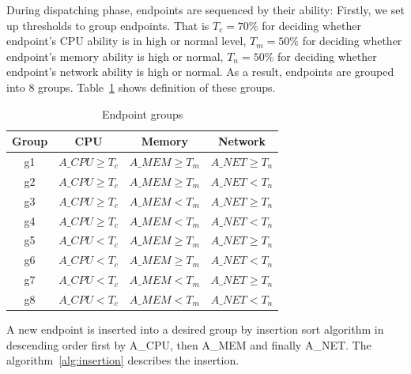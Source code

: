 During dispatching phase, endpoints are sequenced by their ability: Firstly, we set up thresholds to group endpoints. That is $T_{c} = 70\%$ for deciding whether endpoint's CPU ability is in high or normal level, $T_{m} = 50\%$ for deciding whether endpoint's memory ability is high or normal, $T_{n} = 50\%$ for deciding whether endpoint's network ability is high or normal. As a result, endpoints are grouped into 8 groups. Table~{\ref{table:endpoint_groups}} shows definition of these groups.

\hspace{0pt}
\begin{table}[htbp]
 \begin{center}
  \begin{tabular}{c|c|c|c}
   \hline
   Group & CPU               & Memory            & Network           \\  \hline
   g1    & $A\_CPU \geq T_c$ & $A\_MEM \geq T_m$ & $A\_NET \geq T_n$ \\ \hline
   g2    & $A\_CPU \geq T_c$ & $A\_MEM \geq T_m$ & $A\_NET < T_n$    \\ \hline
   g3    & $A\_CPU \geq T_c$ & $A\_MEM < T_m$    & $A\_NET \geq T_n$ \\ \hline
   g4    & $A\_CPU \geq T_c$ & $A\_MEM < T_m$    & $A\_NET < T_n$    \\ \hline
   g5    & $A\_CPU < T_c$    & $A\_MEM \geq T_m$ & $A\_NET \geq T_n$ \\ \hline
   g6    & $A\_CPU < T_c$    & $A\_MEM \geq T_m$ & $A\_NET < T_n$    \\ \hline
   g7    & $A\_CPU < T_c$    & $A\_MEM < T_m$    & $A\_NET \geq T_n$ \\ \hline
   g8    & $A\_CPU < T_c$    & $A\_MEM < T_m$    & $A\_NET < T_n$    \\ \hline
  \end{tabular}
 \end{center}
 \caption{Endpoint groups}
 \label{table:endpoint_groups}
\end{table}

A new endpoint is inserted into a desired group by insertion sort algorithm in descending order first by A\_CPU, then A\_MEM and finally A\_NET.  The  algorithm~{\ref{alg:insertion}} describes the insertion.

